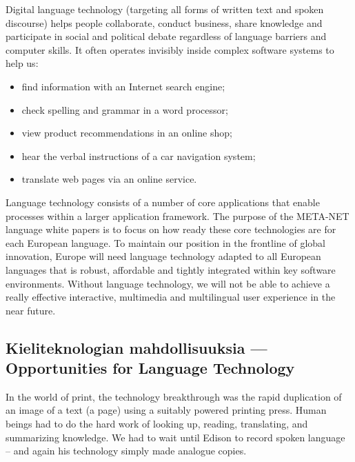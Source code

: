\documentclass[]{../../metanetpaper}
\begin{document}
\begin{multicols}{2}
Digital language technology (targeting all forms of written text and spoken
discourse) helps people collaborate, conduct business, share knowledge and
participate in social and political debate regardless of language barriers and
computer skills. It often operates invisibly inside complex software systems to
help us:
\begin{itemize}
\item find information with an Internet search engine;

\item check spelling and grammar in a word processor;

\item view product recommendations in an online shop;

\item hear the verbal instructions of a car navigation system;

\item translate web pages via an online service.
\end{itemize}


Language technology consists of a number of core applications that
enable processes within a larger application framework. The purpose of
the META-NET language white papers is to focus on how ready these core
technologies are for each European language.
To maintain our position in the frontline of global innovation, Europe
will need language technology adapted to all European languages that
is robust, affordable and tightly integrated within key software
environments. Without language technology, we will not be able to
achieve a really effective interactive, multimedia and multilingual
user experience in the near future.

\subsection{Kieliteknologian mahdollisuuksia --- Opportunities for Language Technology}
In the world of print, the technology breakthrough was the rapid duplication of
an image of a text (a page) using a suitably powered printing press. Human
beings had to do the hard work of looking up, reading, translating, and
summarizing knowledge. We had to wait until Edison to record spoken language –
and again his technology simply made analogue copies.


\end{multicols}
\end{document}
